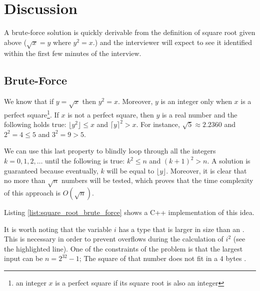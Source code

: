 \section{Discussion}
A brute-force solution is quickly derivable from the definition of square root given above ($\sqrt{x} = y$ where $y^2 = x$.) and the interviewer
will expect to see it identified
within the first few minutes of the interview. 

\subsection{Brute-Force}
We know that if $y = \sqrt{x}$ then $y^2 = x$. Moreover, $y$ is an integer only when $x$ is a perfect square\footnote{an integer $x$ is a perfect square if its square root is also an integer}. 
If $x$ is not a perfect square, then $y$ is a real number and the following holds true: 
$\lfloor{y}^2 \rfloor \leq x$ and $\lceil{y} \rceil^2 > x$.
For instance, $\sqrt{5} \approx 2.2360$ and $2^2=4 \leq 5$ and $3^2=9 > 5$.

We can use this last property to blindly loop through all the integers $k=0,1,2,\ldots$ until 
the following is true: $k^2\leq n$ and $(k+1)^2 > n$.
A solution is guaranteed because eventually, $k$ will be equal to $\lfloor y \rfloor$.
Moreover, it is clear that no more than $\sqrt{n}$ numbers will be tested, which proves that the time complexity of this approach is $O(\sqrt{n})$.

Listing \ref{list:square_root_brute_force} shows a C++ implementation of this idea.




It is worth noting that the variable $i$ has a type that is larger in size than an
. This is necessary in order to prevent overflows during the calculation of $i^2$ (see the highlighted line).
One of the constraints of the problem is that the largest input can be $n=2^{32}-1$; The square of that number does not fit in a $4$ bytes .
	
	


